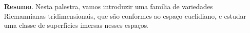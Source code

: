 
	
	
	\noindent\textbf{Resumo}.\label{rsp} 
	Nesta palestra, vamos introduzir uma família de variedades Riemannianas tridimensionais, que são conformes ao espaço euclidiano, e estudar uma classe de superfícies imersas nesses espaços. 
	
	\vspace{24pt}




\clearpage	